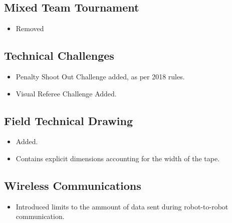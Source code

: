 \subsection*{Mixed Team Tournament}
\begin{itemize}
  \item Removed
\end{itemize}

\subsection*{Technical Challenges}
\begin{itemize}
  \item Penalty Shoot Out Challenge added, as per 2018 rules.
  \item Visual Referee Challenge Added.
\end{itemize}

\subsection*{Field Technical Drawing}
\begin{itemize}
  \item Added.
  \item Contains explicit dimensions accounting for the width of the tape.
\end{itemize}

\subsection*{Wireless Communications}
\begin{itemize}
  \item Introduced limits to the ammount of data sent during robot-to-robot communication.
\end{itemize}
